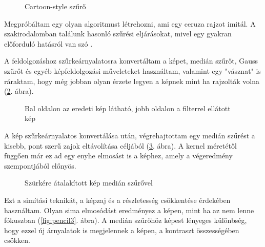 \begin{figure}[h!]
\centering
{}
\caption{Cartoon-style szűrő } 
\label{fig:cartoon5}
\end{figure}




Megpróbáltam egy olyan algoritmust létrehozni, ami egy ceruza rajzot imitál. A szakirodalomban találunk hasonló szűrési eljárásokat, mivel egy gyakran előforduló hatásról van szó \cite{beyeler2}.

A feldolgozáshoz szűrkeárnyalatosra konvertáltam a képet, medián szűrőt, Gauss szűrőt és egyéb képfeldolgozási műveleteket használtam, valamint egy "vásznat" is ráraktam, hogy még jobban olyan érzete legyen a képnek mint ha rajzolták volna (\ref{fig:pencil1}. ábra).

\begin{figure}[h!]
\centering
{}
\caption{Bal oldalon az eredeti kép látható, jobb oldalon a filterrel ellátott kép} 
\label{fig:pencil1}
\end{figure}

\newpage


A kép szűrkeárnyalatos konvertálása után, végrehajtottam egy medián szűrést a kisebb, pont szerű zajok eltávolítása céljából (\ref{fig:pencil2}. ábra). A kernel méretétől függően már ez ad egy enyhe elmosást is a képhez, amely a végeredmény szempontjából előnyös.

\begin{figure}[h!]
\centering
{}
\caption{Szürkére átalakított kép medián szűrővel} 
\label{fig:pencil2}
\end{figure}


Ezt a simítási teknikát, a képzaj  és a részletesség csökkentése érdekében használtam. Olyan sima elmosódást eredményez a képen, mint ha az nem lenne fókuszban (\ref{fig:pencil3}. ábra). A medián szűrőhöz képest lényeges különbség, hogy ezzel új árnyalatok is megjelennek a képen, a kontraszt összességében csökken.

